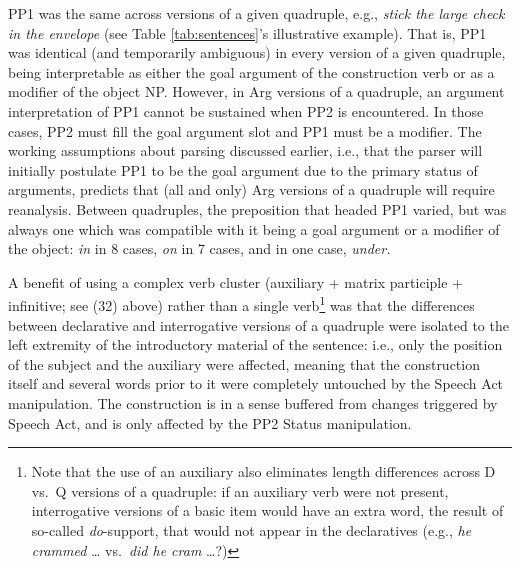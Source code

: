 \documentclass[11pt,oneside]{book}
\let\rmarkdownfootnote\footnote%
\def\footnote{\protect\rmarkdownfootnote}
\begin{document}
PP1 was the same across versions of a given quadruple, e.g., \emph{stick the large check in the envelope} (see Table \ref{tab:sentences}'s illustrative example). That is, PP1 was identical (and temporarily ambiguous) in every version of a given quadruple, being interpretable as either the goal argument of the construction verb or as a modifier of the object NP. However, in Arg versions of a quadruple, an argument interpretation of PP1 cannot be sustained when PP2 is encountered. In those cases, PP2 must fill the goal argument slot and PP1 must be a modifier. The working assumptions about parsing discussed earlier, i.e., that the parser will initially postulate PP1 to be the goal argument due to the primary status of arguments, predicts that (all and only) Arg versions of a quadruple will require reanalysis. Between quadruples, the preposition that headed PP1 varied, but was always one which was compatible with it being a goal argument or a modifier of the object: \emph{in} in 8 cases, \emph{on} in 7 cases, and in one case, \emph{under.}

A benefit of using a complex verb cluster (auxiliary + matrix participle + infinitive; see (32) above) rather than a single verb\footnote{Note that the use of an auxiliary also eliminates length differences across D vs.~Q versions of a quadruple: if an auxiliary verb were not present, interrogative versions of a basic item would have an extra word, the result of so-called \emph{do}-support, that would not appear in the declaratives (e.g., \emph{he crammed} \ldots{} vs.~\emph{did he cram} \ldots?)} was that the differences between declarative and interrogative versions of a quadruple were isolated to the left extremity of the introductory material of the sentence: i.e., only the position of the subject and the auxiliary were affected, meaning that the construction itself and several words prior to it were completely untouched by the Speech Act manipulation. The construction is in a sense buffered from changes triggered by Speech Act, and is only affected by the PP2 Status manipulation.
\end{document}

